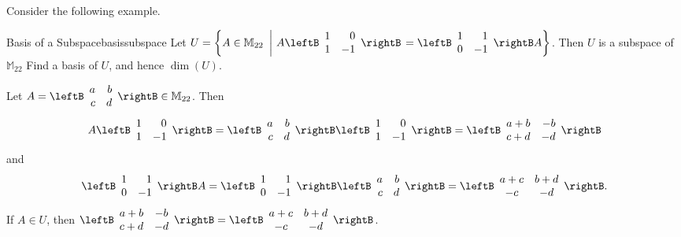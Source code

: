 Consider the following example.

\begin{example}{Basis of a Subspace}{basissubspace}
Let $U=\left\{ A\in\mathbb{M}_{22} ~\left|~
A\leftB\begin{array}{rr}
1 & 0 \\ 1 & -1 \end{array}\rightB\right. 
= \leftB\begin{array}{rr}
1 & 1 \\ 0 & -1 \end{array}\rightB A \right\}$. 
Then $U$ is a subspace of $\mathbb{M}_{22}$ 
Find a basis of $U$, and hence $\dim(U)$.
\end{example}

\begin{solution}
Let $A=\leftB\begin{array}{rr} a & b \\ c & d \end{array}\rightB
\in\mathbb{M}_{22}$.
Then
\[ A\leftB\begin{array}{rr} 1 & 0 \\ 1 & -1 \end{array}\rightB
= \leftB\begin{array}{rr} a & b \\ c & d \end{array}\rightB
\leftB\begin{array}{rr} 1 & 0 \\ 1 & -1 \end{array}\rightB
=\leftB\begin{array}{rr} a+b & -b \\ c+d & -d \end{array}\rightB\]
and
\[ \leftB\begin{array}{rr} 1 & 1 \\ 0 & -1 \end{array}\rightB A
= \leftB\begin{array}{rr} 1 & 1 \\ 0 & -1 \end{array}\rightB
\leftB\begin{array}{rr} a & b \\ c & d \end{array}\rightB
=\leftB\begin{array}{cc} a+c & b+d \\ -c & -d \end{array}\rightB.\]
If $A\in U$, then
$\leftB\begin{array}{cc} a+b & -b \\ c+d & -d \end{array}\rightB=
\leftB\begin{array}{cc} a+c & b+d \\ -c & -d \end{array}\rightB$.


\end{solution}
